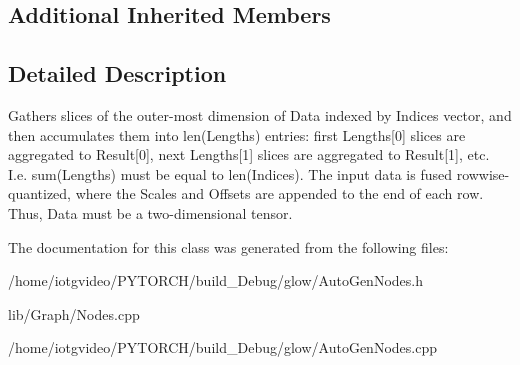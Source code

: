 \subsection*{Additional Inherited Members}


\subsection{Detailed Description}
Gathers slices of the outer-\/most dimension of Data indexed by Indices vector, and then accumulates them into len(\+Lengths) entries\+: first Lengths\mbox{[}0\mbox{]} slices are aggregated to Result\mbox{[}0\mbox{]}, next Lengths\mbox{[}1\mbox{]} slices are aggregated to Result\mbox{[}1\mbox{]}, etc. I.\+e. sum(\+Lengths) must be equal to len(\+Indices). The input data is fused rowwise-\/quantized, where the Scales and Offsets are appended to the end of each row. Thus, Data must be a two-\/dimensional tensor. 

The documentation for this class was generated from the following files\+:\begin{DoxyCompactItemize}
\item 
/home/iotgvideo/\+P\+Y\+T\+O\+R\+C\+H/build\+\_\+\+Debug/glow/Auto\+Gen\+Nodes.\+h\item 
lib/\+Graph/Nodes.\+cpp\item 
/home/iotgvideo/\+P\+Y\+T\+O\+R\+C\+H/build\+\_\+\+Debug/glow/Auto\+Gen\+Nodes.\+cpp\end{DoxyCompactItemize}
